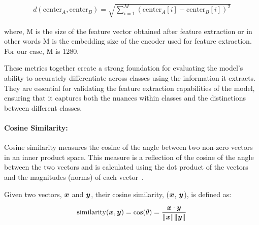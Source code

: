 \begin{equation}
\begin{aligned}
d(\text{center}_A, \text{center}_B) = \sqrt{\sum_{i=1}^{\displaystyle M} (\text{center}_A[i] - \text{center}_B[i])^2}
\end{aligned}
\label{equation:4.12}
\end{equation}

where, M is the size of the feature vector obtained after feature extraction or in other words M is the embedding size of the encoder used for feature extraction. For our case, M is 1280.

These metrics together create a strong foundation for evaluating the model's ability to accurately differentiate across classes using the information it extracts. They are essential for validating the feature extraction capabilities of the model, ensuring that it captures both the nuances within classes and the distinctions between different classes.

\paragraph{Cosine Similarity:}
Cosine similarity measures the cosine of the angle between two non-zero vectors in an inner product space. This measure is a reflection of the cosine of the angle between the two vectors and is calculated using the dot product of the vectors and the magnitudes (norms) of each vector~\citep{wikipedia_cosine_similarity}.

Given two vectors, $\displaystyle {\bm{x}}$ and $\displaystyle {\bm{y}}$, their cosine similarity, ($\displaystyle {\bm{x}}$, $\displaystyle {\bm{y}}$), is defined as:

\begin{equation}
\begin{aligned}
\text{similarity}(\displaystyle {\bm{x}}, \displaystyle {\bm{y}}) = \cos(\theta) = \frac{\displaystyle {\bm{x}} \cdot \displaystyle {\bm{y}}}{\|\displaystyle {\bm{x}}\| \|\displaystyle {\bm{y}}\|}
\end{aligned}
\label{equation:4.13}
\end{equation}

